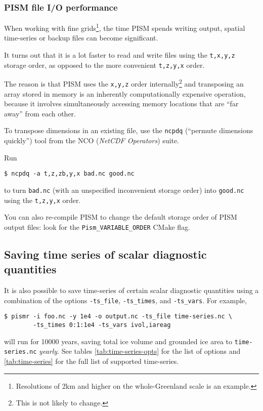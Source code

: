 \subsubsection{PISM file I/O performance}
\label{sec:pism-io-performance}

When working with fine grids\footnote{Resolutions of 2km and higher on the
  whole-Greenland scale is an example.}, the time PISM spends writing output,
spatial time-series or backup files can become significant.

It turns out that it is a lot faster to read and write files using the
\texttt{t,x,y,z} storage order, as opposed to the more convenient
\texttt{t,z,y,x} order.

The reason is that PISM uses the \texttt{x,y,z} order internally\footnote{This
  is not likely to change.} and transposing an array stored in memory is an
inherently computationally expensive operation, because it involves
simultaneously accessing memory locations that are ``far away'' from each
other.

To transpose dimensions in an existing file, use the \texttt{ncpdq} (``permute
dimensions quickly'') tool from the NCO (\emph{NetCDF Operators}) suite.

Run
\begin{verbatim}
$ ncpdq -a t,z,zb,y,x bad.nc good.nc
\end{verbatim}%
to turn \texttt{bad.nc} (with an unspecified inconvenient storage order) into
\texttt{good.nc} using the \texttt{t,z,y,x} order.

You can also re-compile PISM to change the default storage order of PISM output
files: look for the \texttt{Pism_VARIABLE_ORDER} CMake flag.

\subsection{Saving time series of scalar diagnostic quantities}
\label{sec:saving-time-series}
 It is also possible to save time-series of certain scalar diagnostic quantities using a combination of the options \texttt{-ts_file}, \texttt{-ts_times}, and \texttt{-ts_vars}.  For example,
\begin{verbatim}
$ pismr -i foo.nc -y 1e4 -o output.nc -ts_file time-series.nc \
        -ts_times 0:1:1e4 -ts_vars ivol,iareag
\end{verbatim} %
will run for 10000 years, saving total ice volume and grounded ice area to \texttt{time-series.nc} \emph{yearly}. See tables \ref{tab:time-series-opts} for the list of options and \ref{tab:time-series} for the full list of supported time-series.

